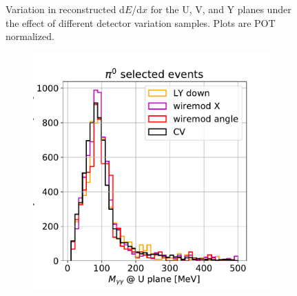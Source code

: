 \documentclass[a4paper]{article}
\begin{document}
\begin{figure}[H]
\begin{center}
\begin{subfigure}[b]{0.3\textwidth}
    \end{subfigure}
\caption{\label{fig:detsys:dedx:eLEElow}Variation in reconstructed d$E$/d$x$ for the U, V, and Y planes under the effect of different detector variation samples. Plots are POT normalized.}
\end{center}
\end{figure}

\begin{figure}[H] 
\begin{center}
    \begin{subfigure}[b]{0.3\textwidth}
    \centering
    \includegraphics[width=1.00\textwidth]{detsys/pi0_mass_U01162020_bnbnumu.pdf}
    \end{subfigure}
    \begin{subfigure}[b]{0.3\textwidth}
    \centering

\end{subfigure}
\end{center}
\end{figure}
\end{document}
